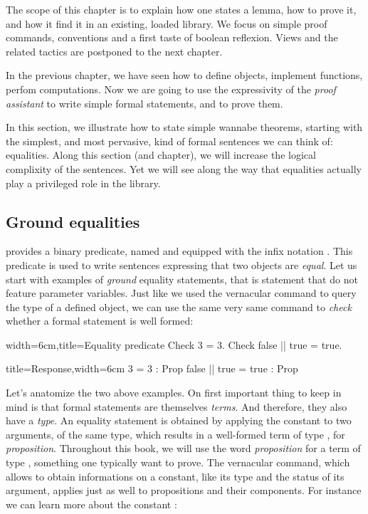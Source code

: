 
The scope of this chapter is to explain how one states a lemma,
how to prove it, and how it find it in an existing, loaded library.
We focus on simple proof commands, conventions and a first taste of
boolean reflexion. Views and the related tactics are postponed to the
next chapter.

\mcbREQUIRE{}


In the previous chapter, we have seen how to define objects, implement
functions, perfom computations. Now we are going to use the
expressivity of the \emph{proof assistant} to write simple formal
statements, and to prove them.


In this section, we illustrate how to state simple wannabe theorems,
starting with the simplest, and most pervasive, kind of formal
sentences we can think of: equalities. Along this section (and
chapter), we will increase the logical complixity of the
sentences. Yet we will see along the way that equalities actually play
a privileged role in the \mcbMC{} library.

\subsection{Ground equalities}

\Coq{} provides a binary predicate, named  and equipped with the
infix notation \C{=}. This predicate is used to write sentences
expressing that two objects are \emph{equal}. Let us start with
examples of \emph{ground} equality statements, that is statement that
do not feature parameter variables. Just like we used the 
vernacular command to query the type of a defined object, we can use
the same very same command to \emph{check} whether a formal statement
is well formed:


\begin{coq}{width=6cm,title=Equality predicate}
Check 3 = 3.
Check false || true = true.
\end{coq}
\begin{coqout}{title=Response,width=6cm}
3 = 3 : Prop
false || true = true : Prop
\end{coqout}
Let's anatomize the two above examples. On first important thing to
keep in mind is that formal statements are themselves \emph{terms}. And
therefore, they also have a \emph{type}. An equality statement is
obtained by applying the constant  to two arguments, of the same
type, which results in a well-formed term of type ,
for \emph{proposition}. Throughout this book, we will use the word
\emph{proposition} for a term of type , something one
typically want to prove. The  vernacular
command, which allows to obtain informations on a constant, like its
type and the status of its argument, applies just as well to
propositions and their components. For instance we can learn more
about the constant :


